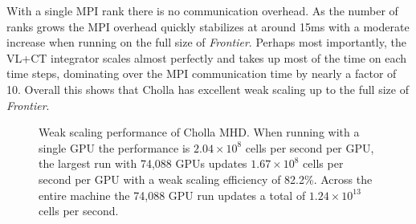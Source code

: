 With a single MPI rank there is no communication overhead. As the number of ranks grows the MPI overhead quickly stabilizes at around 15ms with a moderate increase when running on the full size of \textit{Frontier}. Perhaps most importantly, the VL+CT integrator scales almost perfectly and takes up most of the time on each time steps, dominating over the MPI communication time by nearly a factor of 10. Overall this shows that Cholla has excellent weak scaling up to the full size of \textit{Frontier}.


\begin{figure}[ht!]
    \caption{Weak scaling performance of Cholla MHD. When running with a single GPU the performance is $2.04\times10^8$ cells per second per GPU, the largest run with 74,088 GPUs updates $1.67\times10^8$ cells per second per GPU with a weak scaling efficiency of 82.2\%. Across the entire machine the 74,088 GPU run updates a total of $1.24\times10^{13}$ cells per second. }
    \label{fig:scaling-weak-efficiency}
\end{figure}
